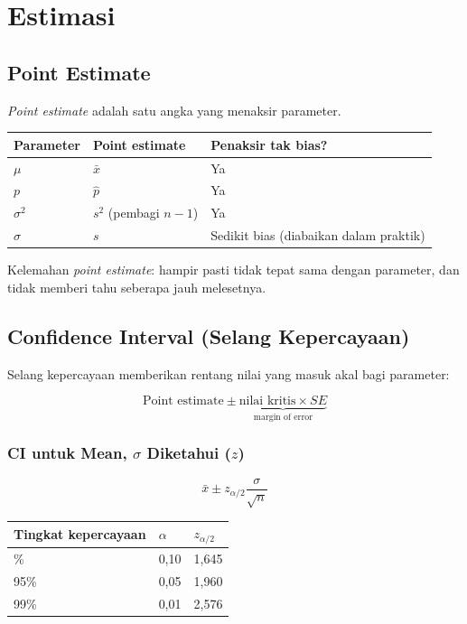 \documentclass[
  indonesian,
  letterpaper,
]{book}
\newcounter{none} %
\begin{document}
\section{Estimasi}\label{estimasi}

\subsection{Point Estimate}\label{point-estimate}

\emph{Point estimate} adalah satu angka yang menaksir parameter.

{\def\LTcaptype{none} %
\begin{longtable}[]{@{}lll@{}}
\toprule\noalign{}
Parameter & Point estimate & Penaksir tak bias? \\
\midrule\noalign{}
\endhead
\bottomrule\noalign{}
\endlastfoot
\(\mu\) & \(\bar{x}\) & Ya \\
\(p\) & \(\hat{p}\) & Ya \\
\(\sigma^2\) & \(s^2\) (pembagi \(n - 1\)) & Ya \\
\(\sigma\) & \(s\) & Sedikit bias (diabaikan dalam praktik) \\
\end{longtable}
}

Kelemahan \emph{point estimate}: hampir pasti tidak tepat sama dengan
parameter, dan tidak memberi tahu seberapa jauh melesetnya.

\subsection{Confidence Interval (Selang
Kepercayaan)}\label{confidence-interval-selang-kepercayaan}

Selang kepercayaan memberikan rentang nilai yang masuk akal bagi
parameter:

\[\text{Point estimate} \pm \underbrace{\text{nilai kritis} \times SE}_{\text{margin of error}}\]

\subsubsection{\texorpdfstring{CI untuk Mean, \(\sigma\) Diketahui
(\(z\))}{CI untuk Mean, \textbackslash sigma Diketahui (z)}}\label{ci-untuk-mean-sigma-diketahui-z}

\[\bar{x} \pm z_{\alpha/2} \frac{\sigma}{\sqrt{n}}\]

{\def\LTcaptype{none} %
\begin{longtable}[]{@{}lll@{}}
\toprule\noalign{}
Tingkat kepercayaan & \(\alpha\) & \(z_{\alpha/2}\) \\
\midrule\noalign{}
\endhead
\bottomrule\noalign{}
\endlastfoot
90\% & 0,10 & 1,645 \\
95\% & 0,05 & 1,960 \\
99\% & 0,01 & 2,576 \\
\end{longtable}
}
\end{document}

